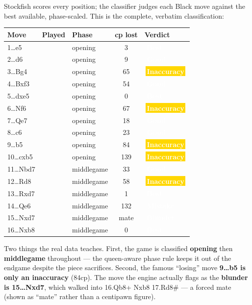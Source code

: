 \documentclass[11pt]{article}
\newcommand{\chip}[2]{\,\colorbox{#1}{\textcolor{white}{\sffamily\bfseries\footnotesize\,#2\,}}\,}
\newcommand{\best}{\chip{forestlt}{Best}}
\newcommand{\good}{\chip{forest}{Good}}
\newcommand{\inacc}{\chip{gold}{Inaccuracy}}
\newcommand{\mistake}{\chip{walnutmid}{Mistake}}
\newcommand{\blun}{\chip{blunder}{Blunder}}
\newcommand{\code}[1]{{\ttfamily #1}}
\begin{document}
\begin{playbox}
Stockfish scores every position; the classifier judges each Black move against
the best available, phase-scaled. This is the complete, verbatim classification:

\begin{center}
\tabnum
\begin{tabularx}{\linewidth}{@{}l l l c Y@{}}
\toprule
\textbf{Move} & \textbf{Played} & \textbf{Phase} & \textbf{cp lost} & \textbf{Verdict} \\
\dots e5 & & opening & 3 & \best \\
2\dots d6 & & opening & 9 & \good \\
3\dots Bg4 & & opening & 65 & \inacc \\
4\dots Bxf3 & & opening & 54 & \good \\
5\dots dxe5 & & opening & 0 & \best \\
6\dots Nf6 & & opening & 67 & \inacc \\
7\dots Qe7 & & opening & 18 & \good \\
8\dots c6 & & opening & 23 & \good \\
9\dots b5 & & opening & 84 & \inacc \\
10\dots cxb5 & & opening & 139 & \inacc \\
11\dots Nbd7 & & middlegame & 33 & \good \\
12\dots Rd8 & & middlegame & 58 & \inacc \\
13\dots Rxd7 & & middlegame & 1 & \best \\
14\dots Qe6 & & middlegame & 132 & \mistake \\
15\dots Nxd7 & & middlegame & mate & \blun \\
16\dots Nxb8 & & middlegame & 0 & \best \\
\bottomrule
\end{tabularx}
\end{center}

Two things the real data teaches. First, the game is classified
\textbf{opening} then \textbf{middlegame} throughout --- the queen-aware phase
rule keeps it out of the endgame despite the piece sacrifices. Second, the
famous ``losing'' move \textbf{9\dots b5 is only an inaccuracy} (84cp). The move
the engine actually flags as the \textbf{blunder is 15\dots Nxd7}, which walked
into \code{16.Qb8+ Nxb8 17.Rd8\#} --- a forced mate (shown as ``mate'' rather
than a centipawn figure).
\end{playbox}
\end{document}
